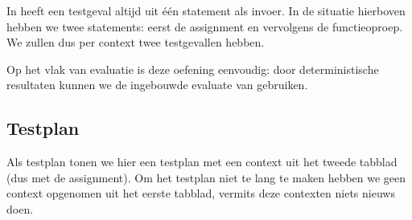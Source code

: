 In \tested{} heeft een testgeval altijd uit één statement als invoer.
In de situatie hierboven hebben we twee statements: eerst de assignment en vervolgens de functieoproep.
We zullen dus per context twee testgevallen hebben.

Op het vlak van evaluatie is deze oefening eenvoudig: door deterministische resultaten kunnen we de ingebouwde evaluate van \tested{} gebruiken.

\subsection{Testplan}\label{subsec:oefening-isbn-testplan}

Als testplan tonen we hier een testplan met een context uit het tweede tabblad (dus met de assignment).
Om het testplan niet te lang te maken hebben we geen context opgenomen uit het eerste tabblad, vermits deze contexten niets nieuws doen.

\inputminted{json}{sources/isbn-plan.tson}
